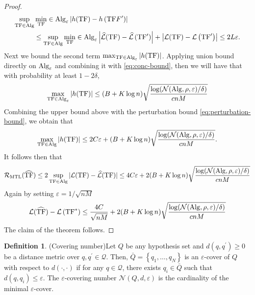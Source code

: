\documentclass[10pt]{article}
\theoremstyle{plain}
\theoremstyle{definition}
\newtheorem{definition}[theorem]{Definition}
\theoremstyle{remark}
\begin{document}
\begin{proof}
\begin{align}
    \sup _{\mathrm{TF} \in \mathrm{Alg}} &\min _{\mathrm{TF}} \in \mathrm{Alg}_{\varepsilon}\left|h(\mathrm{TF})-h\left(\mathrm{TF} F^{\prime}\right)\right| \nonumber\\
    &\leq \sup _{\mathrm{TF} \in \mathrm{Alg}} \min _{\mathrm{TF}} \in \mathrm{Alg}_{\varepsilon}\left|\widehat{\mathcal{L}}(\mathrm{TF})-\widehat{\mathcal{L}}\left(\mathrm{TF}{ }^{\prime}\right)\right|+\left|\mathcal{L}(\mathrm{TF})-\mathcal{L}\left(\mathrm{TF}^{\prime}\right)\right| \leq 2 L \varepsilon . \label{eq:perturbation-bound}
\end{align}
Next we bound the second term $\max _{\mathrm{TF} \in \mathrm{Alg}_{\varepsilon}}|h(\mathrm{TF})|$. Applying union bound directly on $\mathrm{Alg}_{\varepsilon}$ and combining it with \eqref{eq:conc-bound}, then we will have that with probability at least $1-2 \delta$,
\begin{align*}
    \max _{\mathrm{TF} \in \mathrm{Alg}_{\varepsilon}}|h(\mathrm{TF})| \leq(B+K \log n) \sqrt{\frac{\log (\mathcal{N}(\mathrm{Alg}, \rho, \varepsilon) / \delta)}{c n M}}
\end{align*}
Combining the upper bound above with the perturbation bound \eqref{eq:perturbation-bound}, we obtain that
\begin{align*}
    \max _{\mathrm{TF} \in \mathrm{Alg}}|h(\mathrm{TF})| \leq 2 C \varepsilon+(B+K \log n) \sqrt{\frac{\log (\mathcal{N}(\mathrm{Alg}, \rho, \varepsilon) / \delta)}{c n M}}.
\end{align*}
It follows then that
\begin{align*}
    \mathcal{R}_{\mathrm{MTL}}(\widehat{\mathrm{TF}}) \leq 2 \sup _{\mathrm{TF} \in \mathrm{Alg}}|\mathcal{L}(\mathrm{TF})-\widehat{\mathcal{L}}(\mathrm{TF})| \leq 4 C \varepsilon+ 2(B+K \log n) \sqrt{\frac{\log (\mathcal{N}(\mathrm{Alg}, \rho, \varepsilon) / \delta)}{c n M}}
\end{align*}
Again by setting $\varepsilon = 1/\sqrt{n M}$
\begin{align*}
    \mathcal{L}(\widehat{\mathrm{TF}})-\mathcal{L}\left(\mathrm{TF}^*\right)\leq \dfrac{4 C}{\sqrt{n M}}+2(B+K \log n) \sqrt{\frac{\log (\mathcal{N}(\mathrm{Alg}, \rho, \varepsilon) / \delta)}{c n M}}
\end{align*}
The claim of the theorem follows.
\end{proof}
\begin{definition}(Covering number)\label{def:covering-number}
Let $Q$ be any hypothesis set and $d\left(q, q^{\prime}\right) \geq 0$ be a distance metric over $q, q^{\prime} \in \mathcal{Q}$. Then, $\bar{Q}=\left\{q_1, \ldots, q_N\right\}$ is an $\varepsilon$-cover of $Q$ with respect to $d(\cdot, \cdot)$ if for any $q \in \mathcal{Q}$, there exists $q_i \in \bar{Q}$ such that $d\left(q, q_i\right) \leq \varepsilon$. The $\varepsilon$-covering number $\mathcal{N}(Q, d, \varepsilon)$ is the cardinality of the minimal $\varepsilon$-cover.
\end{definition}
\end{document}
